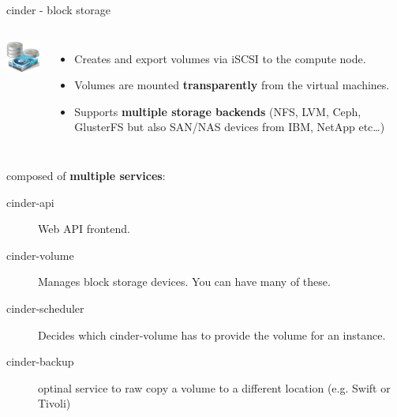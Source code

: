 \documentclass[english,serif,mathserif,usenames,dvipsnames]{beamer}
\begin{document}
\begin{frame}
  {cinder - block storage}
  \begin{columns}
    \column{2cm}
    \includegraphics[width=2cm]{block_storage.png}
    \column{9cm}
    \begin{itemize}
    \item Creates and export volumes via iSCSI to the compute node.
    \item Volumes are mounted \textbf{transparently} from the virtual
      machines.
    \item Supports \textbf{multiple storage backends} (NFS, LVM, Ceph,
      GlusterFS but also SAN/NAS devices from IBM, NetApp etc\ldots )
    \end{itemize}
  \end{columns}

  \+
  composed of \textbf{multiple services}:
  \begin{description}
  \item[cinder-api] Web API frontend.
  \item[cinder-volume] Manages block storage devices. You can have
    many of these.
  \item[cinder-scheduler] Decides which cinder-volume has to provide
    the volume for an instance.
  \item[cinder-backup] optinal service to raw copy a volume to a
    different location (e.g. Swift or Tivoli)
  \end{description}
\end{frame}
\end{document}
